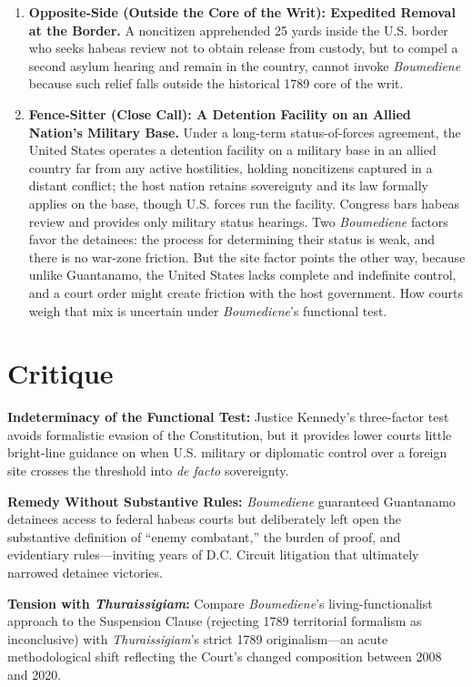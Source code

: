 \documentclass[12pt]{article}
\begin{document}
\begin{enumerate}
\item \textbf{Opposite-Side (Outside the Core of the Writ): Expedited Removal at the Border.} A noncitizen apprehended 25 yards inside the U.S. border who seeks habeas review not to obtain release from custody, but to compel a second asylum hearing and remain in the country, cannot invoke \textit{Boumediene} because such relief falls outside the historical 1789 core of the writ.

\item \textbf{Fence-Sitter (Close Call): A Detention Facility on an Allied Nation's Military Base.} Under a long-term status-of-forces agreement, the United States operates a detention facility on a military base in an allied country far from any active hostilities, holding noncitizens captured in a distant conflict; the host nation retains sovereignty and its law formally applies on the base, though U.S. forces run the facility. Congress bars habeas review and provides only military status hearings. Two \textit{Boumediene} factors favor the detainees: the process for determining their status is weak, and there is no war-zone friction. But the site factor points the other way, because unlike Guantanamo, the United States lacks complete and indefinite control, and a court order might create friction with the host government. How courts weigh that mix is uncertain under \textit{Boumediene}'s functional test.

\end{enumerate}

\section{Critique}
\textbf{Indeterminacy of the Functional Test:} Justice Kennedy's three-factor test avoids formalistic evasion of the Constitution, but it provides lower courts little bright-line guidance on when U.S. military or diplomatic control over a foreign site crosses the threshold into \textit{de facto} sovereignty.

\textbf{Remedy Without Substantive Rules:} \textit{Boumediene} guaranteed Guantanamo detainees access to federal habeas courts but deliberately left open the substantive definition of ``enemy combatant,'' the burden of proof, and evidentiary rules---inviting years of D.C. Circuit litigation that ultimately narrowed detainee victories.

\textbf{Tension with \textit{Thuraissigiam}:} Compare \textit{Boumediene}'s living-functionalist approach to the Suspension Clause (rejecting 1789 territorial formalism as inconclusive) with \textit{Thuraissigiam}'s strict 1789 originalism---an acute methodological shift reflecting the Court's changed composition between 2008 and 2020.
\end{document}

